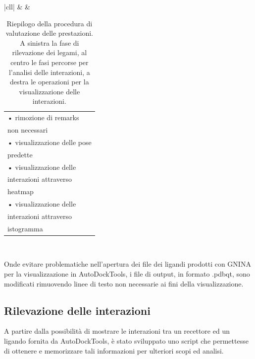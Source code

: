 \begin{table}[H]
{\begin{tabular}{|cll|}
 &  & \begin{tabular}[c]{@{}l@{}}• rimozione di remarks\\non necessari \\ • visualizzazione delle pose\\ predette\\ • visualizzazione delle\\ interazioni attraverso\\ heatmap\\ • visualizzazione delle\\ interazioni attraverso\\ istogramma\end{tabular} \\ \hline
\end{tabular}%
}
\caption[Riepilogo della procedura di valutazione.]{Riepilogo della procedura di valutazione delle prestazioni. A sinistra la fase di rilevazione dei legami, al centro le fasi percorse per l'analisi delle interazioni, a destra le operazioni per la visualizzazione delle interazioni. }
\label{evaluation_table}
\end{table}

Onde evitare problematiche nell'apertura dei file dei ligandi prodotti con GNINA per la visualizzazione in AutoDockTools, i file di output, in formato .pdbqt, sono modificati rimuovendo linee di testo non necessarie ai fini della visualizzazione.

\subsection{Rilevazione delle interazioni}
A partire dalla possibilità di mostrare le interazioni tra un recettore ed un ligando fornita da AutoDockTools, è stato sviluppato uno script che permettesse di ottenere e memorizzare tali informazioni per ulteriori scopi ed analisi.

